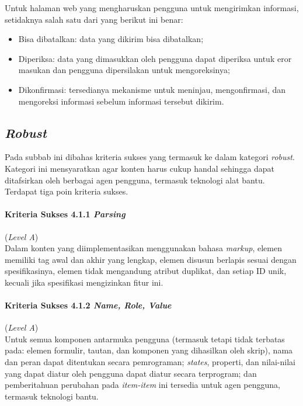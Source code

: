 Untuk halaman web yang mengharuskan pengguna untuk mengirimkan informasi, setidaknya salah satu dari yang berikut ini benar:

\begin{itemize}
	\item Bisa dibatalkan: data yang dikirim bisa dibatalkan;
	\item Diperiksa: data yang dimasukkan oleh pengguna dapat diperiksa untuk eror masukan dan pengguna dipersilakan untuk mengoreksinya;
	\item Dikonfirmasi: tersedianya mekanisme untuk meninjau, mengonfirmasi, dan mengoreksi informasi sebelum informasi tersebut dikirim.
\end{itemize}

\subsection{\textit{Robust}}
\label{subsec:kriteria_robust}

Pada subbab ini dibahas kriteria sukses yang termasuk ke dalam kategori \textit{robust}. Kategori ini mensyaratkan agar konten harus cukup handal sehingga dapat ditafsirkan oleh berbagai agen pengguna, termasuk teknologi alat bantu. Terdapat tiga poin kriteria sukses.

\paragraph{Kriteria Sukses 4.1.1 \textit{Parsing}}
\label{subsec:kriteria_4.1.1}
(\textit{Level A}) \\

Dalam konten yang diimplementasikan menggunakan bahasa \textit{markup}, elemen memiliki tag awal dan akhir yang lengkap, elemen disusun berlapis sesuai dengan spesifikasinya, elemen tidak mengandung atribut duplikat, dan setiap ID unik, kecuali jika spesifikasi mengizinkan fitur ini.

\paragraph{Kriteria Sukses 4.1.2 \textit{Name, Role, Value}}
\label{subsec:kriteria_4.1.2}
(\textit{Level A}) \\

Untuk semua komponen antarmuka pengguna (termasuk tetapi tidak terbatas pada: elemen formulir, tautan, dan komponen yang dihasilkan oleh skrip), nama dan peran dapat ditentukan secara pemrograman; \textit{states}, properti, dan nilai-nilai yang dapat diatur oleh pengguna dapat diatur secara terprogram; dan pemberitahuan perubahan pada \textit{item-item} ini tersedia untuk agen pengguna, termasuk teknologi bantu.

